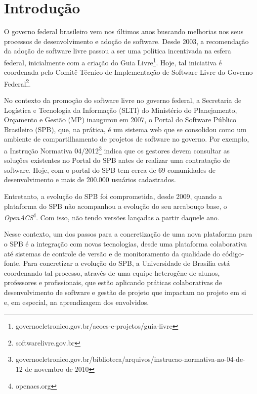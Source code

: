 \section{Introdução}
\label{sec:introducao}

O governo federal brasileiro vem nos últimos anos buscando melhorias nos
seus processos de desenvolvimento e adoção de software.
%
Desde 2003, a recomendação da adoção de software livre passou a ser uma política
incentivada na esfera federal, inicialmente com a criação do
Guia Livre\footnote{governoeletronico.gov.br/acoes-e-projetos/guia-livre}.
%
Hoje, tal iniciativa é coordenada pelo Comitê Técnico de Implementação de
Software Livre do Governo Federal\footnote{softwarelivre.gov.br}.


No contexto da promoção do software livre no governo federal, a
Secretaria de Logística e Tecnologia da Informação (SLTI) do Ministério do
Planejamento, Orçamento e Gestão (MP) inaugurou em 2007, o Portal do Software
Público Brasileiro (SPB), que, na prática, é um sistema web que se consolidou como
um ambiente de compartilhamento de projetos de software no governo.
%
Por exemplo, a Instrução Normativa
04/2012\footnote{governoeletronico.gov.br/biblioteca/arquivos/instrucao-normativa-no-04-de-12-de-novembro-de-2010}
indica que os gestores devem consultar as soluções existentes no Portal do SPB
antes de realizar uma contratação de software.
%
Hoje, com o portal do SPB tem cerca de 69 comunidades de
desenvolvimento e mais de 200.000 usuários cadastrados.

Entretanto, a evolução do SPB foi comprometida, desde 2009, quando a plataforma
do SPB não acompanhou a evolução do seu arcabouço base,
o \emph{OpenACS}\footnote{openacs.org}.
%
Com isso, não tendo versões lançadas a partir daquele ano.

Nesse contexto, um dos passos para a concretização de uma nova plataforma para o
SPB é a integração com novas tecnologias, desde uma plataforma colaborativa até sistemas
de controle de versão e de monitoramento da qualidade do código-fonte.
%
Para concretizar a evolução do SPB, a Universidade de Brasília está coordenando
tal processo, através de uma equipe heterogêne de alunos, professores e
profissionais, que estão aplicando práticas colaborativas de desenvolvimento
de software e gestão de projeto que impactam no projeto em si e, em especial,
na aprendizagem dos envolvidos.



